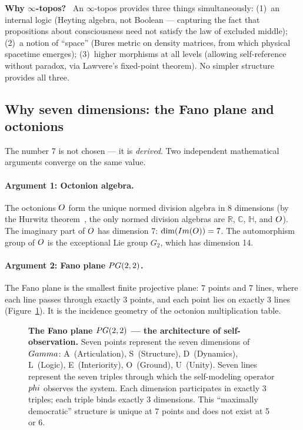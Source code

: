 \textbf{Why $\infty$-topos?}~\cite{lurie2009} An $\infty$-topos provides three things simultaneously:
(1)~an internal logic (Heyting algebra, not Boolean --- capturing the fact that propositions
about consciousness need not satisfy the law of excluded middle);
(2)~a notion of ``space'' (Bures metric on density matrices, from which physical spacetime
emerges); (3)~higher morphisms at all levels (allowing self-reference without paradox,
via Lawvere's fixed-point theorem). No simpler structure provides all three.

\subsection{Why seven dimensions: the Fano plane and octonions}
\label{subsec:why-seven}

The number 7 is not chosen --- it is \emph{derived}. Two independent mathematical arguments
converge on the same value.

\paragraph{Argument 1: Octonion algebra.}
The octonions $O$ form the unique normed division algebra in 8 dimensions (by the
Hurwitz theorem~\cite{hurwitz1898}, the only normed division algebras are $\mathbb{R}$,
$\mathbb{C}$, $\mathbb{H}$, and $O$). The imaginary part of $O$ has dimension 7:
$\dim(Im(O)) = 7$. The automorphism group of $O$ is the exceptional
Lie group $G_2$, which has dimension 14.

\paragraph{Argument 2: Fano plane $PG(2,2)$.}
The Fano plane is the smallest finite projective plane: 7 points and 7 lines,
where each line passes through exactly 3 points, and each point lies on
exactly 3 lines (Figure~\ref{fig:fano}). It is the incidence geometry of
the octonion multiplication table.

\begin{figure}[H]
\centering

\caption{\textbf{The Fano plane $PG(2,2)$ --- the architecture of self-observation.}
Seven points represent the seven dimensions of $Gamma$: A~(Articulation), S~(Structure),
D~(Dynamics), L~(Logic), E~(Interiority), O~(Ground), U~(Unity). Seven lines represent
the seven triples through which the self-modeling operator $phi$ observes the system.
Each dimension participates in exactly 3 triples; each triple binds exactly 3 dimensions.
This ``maximally democratic'' structure is unique at 7 points and does not exist at 5 or 6.}
\label{fig:fano}
\end{figure}

